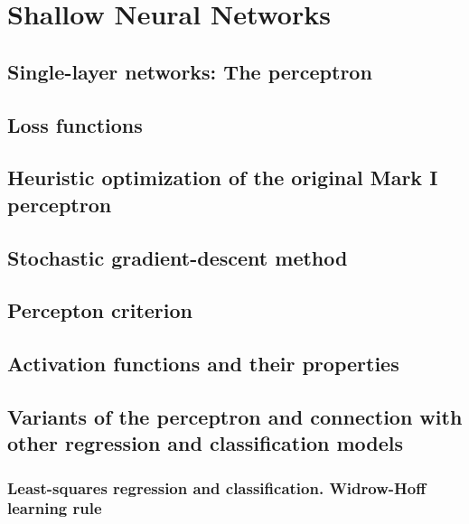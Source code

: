 \renewcommand{\prevpart}{1 }
\renewcommand{\thispart}{2 }
\renewcommand{\nextpart}{3 }

\section{Shallow Neural Networks}





\subsection{Single-layer networks: The perceptron}


\subsection{Loss functions}

\subsection{Heuristic optimization of the original Mark I perceptron}

\subsection{Stochastic gradient-descent method}

\subsection{Percepton criterion}

\subsection{Activation functions and their properties}

\subsection{Variants of the perceptron and 
    connection with other regression and classification models}

\subsubsection{Least-squares regression and classification. Widrow-Hoff learning rule}

